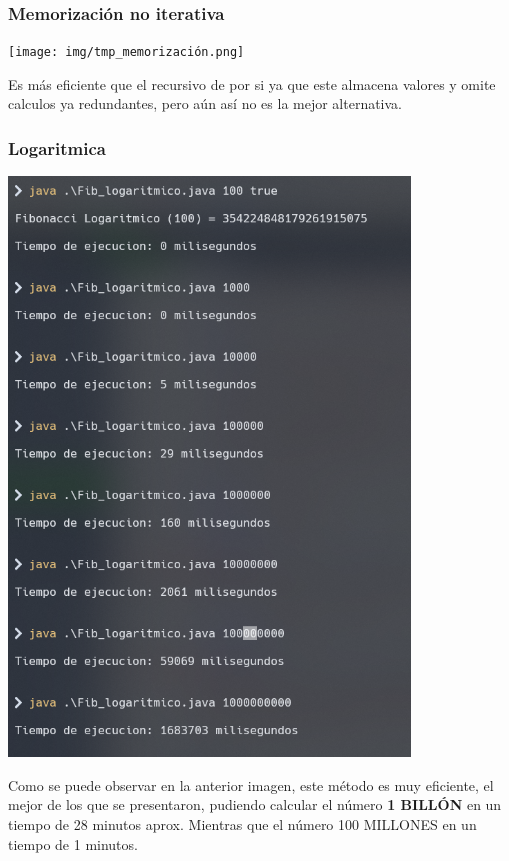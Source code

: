 \documentclass{article}
\begin{document}
            \subsubsection{Memorización no iterativa}
            \begin{center}
                \texttt{[image: img/tmp\_memorización.png]}
            \end{center}
            Es más eficiente que el recursivo de por si ya que este almacena valores y omite calculos ya redundantes, pero aún así no es la mejor alternativa.
            
            \subsubsection{Logaritmica}
            \begin{center}
                \includegraphics[width=0.8\textwidth]{img/tmp_logaritmica.png}
            \end{center}
            Como se puede observar en la anterior imagen, este método es muy eficiente, el mejor de los que se presentaron, pudiendo calcular el número \textbf{1 BILLÓN} en un tiempo de 28 minutos aprox. Mientras que el número 100 MILLONES en un tiempo de 1 minutos. 
\end{document}
